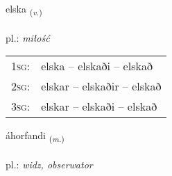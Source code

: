 \documentclass[frontgrid, backgrid]{flacards}\usepackage[]{graphicx}\usepackage[]{xcolor}
\begin{document}
\renewcommand{\blhead}{\vskip5pt {\small\bfseries\footnotesize Sagnorð | Verb }}
\renewcommand{\bcfoot}{\vskip5pt \hspace{2pt}{\small\bfseries\footnotesize 2K}}


{elska \small{\textsubscript{(\textit{v.})}} \\[1ex] %
\textphonetic{[ɛlska]} \\
pl.: \emph{miłość} \\  [2ex]
\renewcommand*{\arraystretch}{0.8}
\begin{tabular}{p{1cm}l}
\textsc{1sg}: & elska -- elskaði -- elskað \\ 
\textsc{2sg}: & elskar -- elskaðir -- elskað \\ 
\textsc{3sg}: & elskar -- elskaði -- elskað \\ 
\end{tabular}
}

\renewcommand{\flhead}{\vskip5pt \fboxsep=0pt {\small\bfseries\footnotesize Nafnorð | Noun}}
\renewcommand{\fcfoot}{\vskip5pt \fboxsep=0pt \hspace{2pt}{\small\bfseries\footnotesize 2K}}

\renewcommand{\blhead}{\vskip5pt {\small\bfseries\footnotesize Nafnorð | Noun }}
\renewcommand{\bcfoot}{\vskip5pt \hspace{2pt}{\small\bfseries\footnotesize 2K}}


{áhorfandi \small{\textsubscript{(\textit{m.})}} \\[1ex] %
\textphonetic{[auːhɔrvantɪ]} \\
pl.: \emph{widz, obserwator} \\  [2ex]
\renewcommand*{\arraystretch}{0.8}
}
\end{document}
